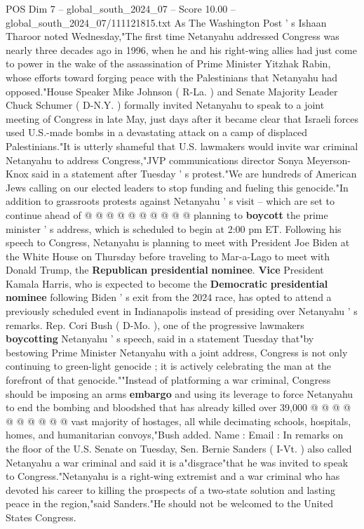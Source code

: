 \begin{textsample}{POS Dim 7 – global\_south\_2024\_07 – Score 10.00 – global\_south\_2024\_07/111121815.txt}
As The Washington Post ' s Ishaan Tharoor noted Wednesday,"The first time Netanyahu addressed Congress was nearly three decades ago in 1996, when he and his right-wing allies had just come to power in the wake of the assassination of Prime Minister Yitzhak Rabin, whose efforts toward forging peace with the Palestinians that Netanyahu had opposed."House Speaker Mike Johnson ( R-La. ) and Senate Majority Leader Chuck Schumer ( D-N.Y. ) formally invited Netanyahu to speak to a joint meeting of Congress in late May, just days after it became clear that Israeli forces used U.S.-made bombs in a devastating attack on a camp of displaced Palestinians."It is utterly shameful that U.S. lawmakers would invite war criminal Netanyahu to address Congress,"JVP communications director Sonya Meyerson-Knox said in a statement after Tuesday ' s protest."We are hundreds of American Jews calling on our elected leaders to stop funding and fueling this genocide."In addition to grassroots protests against Netanyahu ' s visit -- which are set to continue ahead of @ @ @ @ @ @ @ @ @ @ planning to \textbf{boycott} the prime minister ' s address, which is scheduled to begin at 2:00 pm ET.
Following his speech to Congress, Netanyahu is planning to meet with President Joe Biden at the White House on Thursday before traveling to Mar-a-Lago to meet with Donald Trump, the \textbf{Republican} \textbf{presidential} \textbf{nominee}. \textbf{Vice} President Kamala Harris, who is expected to become the \textbf{Democratic} \textbf{presidential} \textbf{nominee} following Biden ' s exit from the 2024 race, has opted to attend a previously scheduled event in Indianapolis instead of presiding over Netanyahu ' s remarks.
Rep.
Cori Bush ( D-Mo. ), one of the progressive lawmakers \textbf{boycotting} Netanyahu ' s speech, said in a statement Tuesday that"by bestowing Prime Minister Netanyahu with a joint address, Congress is not only continuing to green-light genocide ; it is actively celebrating the man at the forefront of that genocide.""Instead of platforming a war criminal, Congress should be imposing an arms \textbf{embargo} and using its leverage to force Netanyahu to end the bombing and bloodshed that has already killed over 39,000 @ @ @ @ @ @ @ @ @ @ vast majority of hostages, all while decimating schools, hospitals, homes, and humanitarian convoys,"Bush added.
Name : Email : In remarks on the floor of the U.S.
Senate on Tuesday, Sen.
Bernie Sanders ( I-Vt. ) also called Netanyahu a war criminal and said it is a"disgrace"that he was invited to speak to Congress."Netanyahu is a right-wing extremist and a war criminal who has devoted his career to killing the prospects of a two-state solution and lasting peace in the region,"said Sanders."He should not be welcomed to the United States Congress.

\end{textsample}
